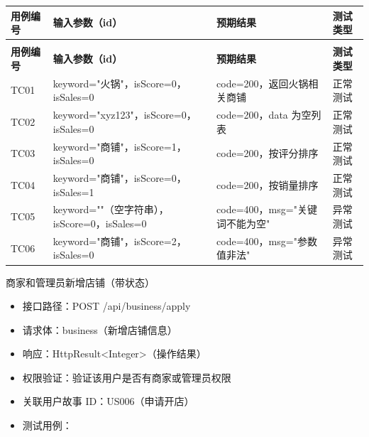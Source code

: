 \begin{levellist}
\begin{levellist}
\begin{itemize}
\begin{longtable}{>{\centering\arraybackslash}m{2cm} >{\centering\arraybackslash}m{4cm} >{\centering\arraybackslash}m{5cm} >{\centering\arraybackslash}m{2cm}}
                      \toprule
                      \textbf{用例编号} & \textbf{输入参数（id）}                    & \textbf{预期结果}          & \textbf{测试类型} \\
                      \midrule
                      \endfirsthead

                      \multicolumn{4}{c}{{\tablename\ \thetable{} 续表}}                                              \\
                      \toprule
                      \textbf{用例编号} & \textbf{输入参数（id）}                    & \textbf{预期结果}          & \textbf{测试类型} \\
                      \midrule
                      \endhead

                      \bottomrule
                      \endfoot

                      TC01          & keyword="火锅"，isScore=0，isSales=0     & code=200，返回火锅相关商铺      & 正常测试          \\
                      TC02          & keyword="xyz123"，isScore=0，isSales=0 & code=200，data 为空列表     & 正常测试          \\
                      TC03          & keyword="商铺"，isScore=1，isSales=0     & code=200，按评分排序         & 正常测试          \\
                      TC04          & keyword="商铺"，isScore=0，isSales=1     & code=200，按销量排序         & 正常测试          \\
                      TC05          & keyword=""（空字符串），isScore=0，isSales=0 & code=400，msg="关键词不能为空" & 异常测试          \\
                      TC06          & keyword="商铺"，isScore=2，isSales=0     & code=400，msg="参数值非法"   & 异常测试          \\
                  \end{longtable}
        \end{itemize}

        \item 商家和管理员新增店铺（带状态）
        \begin{itemize}
            \item 接口路径：POST /api/business/apply
            \item 请求体：business（新增店铺信息）
            \item 响应：HttpResult<Integer>（操作结果）
            \item 权限验证：验证该用户是否有商家或管理员权限
            \item 关联用户故事 ID：US006（申请开店）
            \item 测试用例：
                  \begin{longtable}{>{\centering\arraybackslash}m{2cm} >{\centering\arraybackslash}m{4cm} >{\centering\arraybackslash}m{5cm} >{\centering\arraybackslash}m{2cm}}


\end{longtable}
\end{itemize}
\end{levellist}
\end{levellist}
